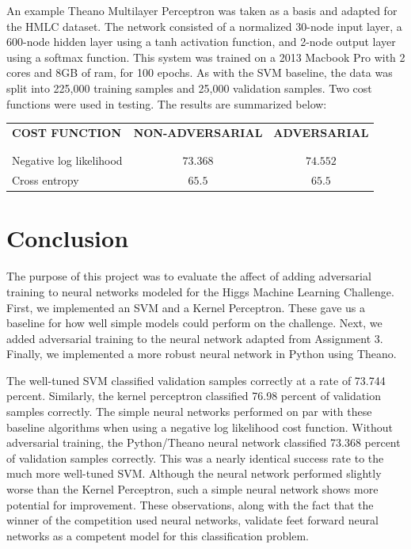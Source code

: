 \documentclass          {article} %
\begin{document}
An example Theano Multilayer Perceptron was taken as a basis and adapted for the HMLC dataset. The network consisted of a normalized 30-node input layer, a 600-node hidden layer using a tanh activation function, and 2-node output layer using a softmax function. This system was trained on a 2013 Macbook Pro with 2 cores and 8GB of ram, for 100 epochs. As with the SVM baseline, the data was split into 225,000 training samples and 25,000 validation samples. Two cost functions were used in testing. The results are summarized below:

\begin{center}
\begin{tabular}{l c c}
{\bf COST FUNCTION} & {\bf NON-ADVERSARIAL} & {\bf ADVERSARIAL}\\
\\ \hline \\
Negative log likelihood & $73.368$ & $74.552$\\
Cross entropy           & $65.5$   & $65.5$\\
\end{tabular}
\end{center}


\section                {Conclusion}
\label                  {sec:conclusion}

The purpose of this project was to evaluate the affect of adding adversarial training to neural networks modeled for the Higgs Machine Learning Challenge. First, we implemented an SVM and a Kernel Perceptron. These gave us a baseline for how well simple models could perform on the challenge. Next, we added adversarial training to the neural network adapted from Assignment 3. Finally, we implemented a more robust neural network in Python using Theano.
 
The well-tuned SVM classified validation samples correctly at a rate of 73.744 percent. Similarly, the kernel perceptron classified 76.98 percent of validation samples correctly. The simple neural networks performed on par with these baseline algorithms when using a negative log likelihood cost function. Without adversarial training, the Python/Theano neural network classified 73.368 percent of validation samples correctly. This was a nearly identical success rate to the much more well-tuned SVM. Although the neural network performed slightly worse than the Kernel Perceptron, such a simple neural network shows more potential for improvement. These observations, along with the fact that the winner of the competition used neural networks, validate feet forward neural networks as a competent model for this classification problem.
\end{document}
